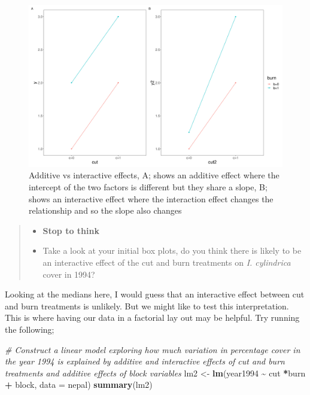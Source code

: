 \documentclass[
]{book}
\newenvironment{Shaded}{\begin{snugshade}}{\end{snugshade}}
\newcommand{\AttributeTok}[1]{\textcolor[rgb]{0.13,0.29,0.53}{#1}}
\newcommand{\CommentTok}[1]{\textcolor[rgb]{0.56,0.35,0.01}{\textit{#1}}}
\newcommand{\FunctionTok}[1]{\textcolor[rgb]{0.13,0.29,0.53}{\textbf{#1}}}
\newcommand{\NormalTok}[1]{#1}
\newcommand{\OtherTok}[1]{\textcolor[rgb]{0.56,0.35,0.01}{#1}}
\newcommand{\SpecialCharTok}[1]{\textcolor[rgb]{0.81,0.36,0.00}{\textbf{#1}}}
\providecommand{\tightlist}{%
  \setlength{\itemsep}{0pt}\setlength{\parskip}{0pt}}
\begin{document}
\begin{figure}
\includegraphics[width=0.9\linewidth]{figures/additive_vs_interactive} \caption{Additive vs interactive effects, A; shows an additive effect where the intercept of the two factors is different but they share a slope, B; shows an interactive effect where the interaction effect changes the relationship and so the slope also changes}\label{fig:unnamed-chunk-97}
\end{figure}

\begin{quote}
\begin{itemize}
\tightlist
\item
  \textbf{Stop to think}
\item
  Take a look at your initial box plots, do you think there is likely to be an interactive effect of the cut and burn treatments on \emph{I. cylindrica} cover in 1994?
\end{itemize}
\end{quote}

Looking at the medians here, I would guess that an interactive effect between cut and burn treatments is unlikely. But we might like to test this interpretation. This is where having our data in a factorial lay out may be helpful. Try running the following;

\begin{Shaded}
\begin{Highlighting}[]
\CommentTok{\# Construct a linear model exploring how much variation in percentage cover in the year 1994 is explained by additive and interactive effects of cut and burn treatments and additive effects of block variables}
\NormalTok{lm2 }\OtherTok{\textless{}{-}} \FunctionTok{lm}\NormalTok{(year1994 }\SpecialCharTok{\textasciitilde{}}\NormalTok{ cut }\SpecialCharTok{*}\NormalTok{burn }\SpecialCharTok{+}\NormalTok{ block, }\AttributeTok{data =}\NormalTok{ nepal)}
\FunctionTok{summary}\NormalTok{(lm2)}
\end{Highlighting}
\end{Shaded}
\end{document}
